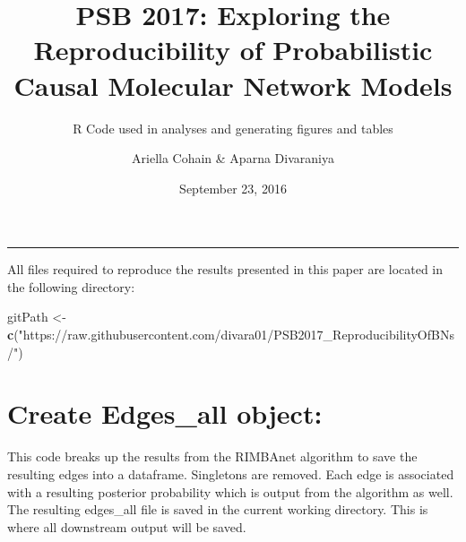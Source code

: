 \documentclass[]{article}
\title{PSB 2017: Exploring the Reproducibility of Probabilistic Causal
Molecular Network Models}
\subtitle{R Code used in analyses and generating figures and tables}
\author{Ariella Cohain \& Aparna Divaraniya}
\date{September 23, 2016}
\newenvironment{Shaded}{\begin{snugshade}}{\end{snugshade}}
\newcommand{\KeywordTok}[1]{\textcolor[rgb]{0.13,0.29,0.53}{\textbf{{#1}}}}
\newcommand{\StringTok}[1]{\textcolor[rgb]{0.31,0.60,0.02}{{#1}}}
\newcommand{\NormalTok}[1]{{#1}}
\begin{document}
\maketitle

{
\setcounter{tocdepth}{4}
\tableofcontents
}
\begin{center}\rule{0.5\linewidth}{\linethickness}\end{center}

All files required to reproduce the results presented in this paper are
located in the following directory:

\begin{Shaded}
\begin{Highlighting}[]
\NormalTok{gitPath <-}\StringTok{ }\KeywordTok{c}\NormalTok{(}\StringTok{"https://raw.githubusercontent.com/divara01/PSB2017_ReproducibilityOfBNs/"}\NormalTok{)}
\end{Highlighting}
\end{Shaded}

\section{Create Edges\_all object:}\label{create-edgesux5fall-object}

This code breaks up the results from the RIMBAnet algorithm to save the
resulting edges into a dataframe. Singletons are removed. Each edge is
associated with a resulting posterior probability which is output from
the algorithm as well. The resulting edges\_all file is saved in the
current working directory. This is where all downstream output will be
saved.
\end{document}

